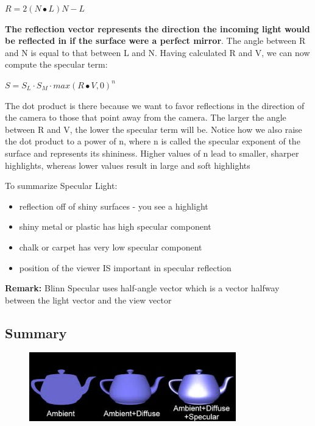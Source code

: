 \documentclass{mini}
\begin{document}
\begin{center}
    $ R = 2(N \bullet L) N-L$
\end{center}

{\bf The reflection vector represents the direction the incoming light would be reflected in if the surface were a perfect mirror}. The angle between R and N is equal to that between L and N. Having calculated R and V, we can now compute the specular term:

\begin{center}
    $ S = S_L \cdot S_M \cdot max(R \bullet V, 0)^{n} $
\end{center}

The dot product is there because we want to favor reflections in the direction of the camera to those that point away from the camera. The larger the angle between R and V, the lower the specular term will be. Notice how we also raise the dot product to a power of n, where n is called the specular exponent of the surface and represents its shininess. Higher values of n lead to smaller, sharper highlights, whereas lower values result in large and soft highlights

To summarize Specular Light:
\begin{itemize}
    \item reflection off of shiny surfaces - you see a highlight
    \item shiny metal or plastic has high specular component
    \item chalk or carpet has very low specular component
    \item position of the viewer IS important in specular reflection
\end{itemize}


{\bf Remark:} Blinn Specular uses half-angle vector which is a vector halfway between the light vector and the view vector


\subsection{Summary}

\begin{figure}[H]
    \centering
    \includegraphics[width=0.8\textwidth]{./images/phong_components.jpg}
    \caption{}
    \label{fig:phong_components}
\end{figure}
\end{document}
